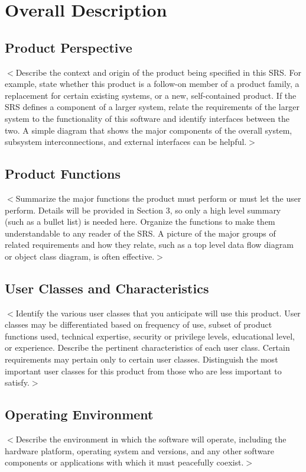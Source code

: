 \documentclass[a4paper, 11pt]{scrreprt}
\begin{document}
\chapter{Overall Description}

\section{Product Perspective}
$<$Describe the context and origin of the product being specified in this SRS.  
For example, state whether this product is a follow-on member of a product 
family, a replacement for certain existing systems, or a new, self-contained 
product. If the SRS defines a component of a larger system, relate the 
requirements of the larger system to the functionality of this software and 
identify interfaces between the two. A simple diagram that shows the major 
components of the overall system, subsystem interconnections, and external 
interfaces can be helpful.$>$

\section{Product Functions}
$<$Summarize the major functions the product must perform or must let the user 
perform. Details will be provided in Section 3, so only a high level summary 
(such as a bullet list) is needed here. Organize the functions to make them 
understandable to any reader of the SRS. A picture of the major groups of 
related requirements and how they relate, such as a top level data flow diagram 
or object class diagram, is often effective.$>$

\section{User Classes and Characteristics}
$<$Identify the various user classes that you anticipate will use this product.  
User classes may be differentiated based on frequency of use, subset of product 
functions used, technical expertise, security or privilege levels, educational 
level, or experience. Describe the pertinent characteristics of each user class.  
Certain requirements may pertain only to certain user classes. Distinguish the 
most important user classes for this product from those who are less important 
to satisfy.$>$

\section{Operating Environment}
$<$Describe the environment in which the software will operate, including the 
hardware platform, operating system and versions, and any other software 
components or applications with which it must peacefully coexist.$>$
\end{document}
